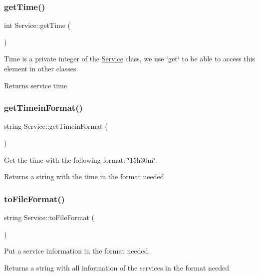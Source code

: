 \subsubsection{\texorpdfstring{get\+Time()}{getTime()}}
{\footnotesize\ttfamily int Service\+::get\+Time (\begin{DoxyParamCaption}{ }\end{DoxyParamCaption})}

Time is a private integer of the \hyperlink{classService}{Service} class, we use \char`\"{}get\char`\"{} to be able to access this element in other classes. \begin{DoxyReturn}{Returns}
service time 
\end{DoxyReturn}
\hypertarget{classService_aa0a732dc04ba4ec18709575f1dcdfee5}{}\label{classService_aa0a732dc04ba4ec18709575f1dcdfee5} 
\subsubsection{\texorpdfstring{get\+Timein\+Format()}{getTimeinFormat()}}
{\footnotesize\ttfamily string Service\+::get\+Timein\+Format (\begin{DoxyParamCaption}{ }\end{DoxyParamCaption})}

Get the time with the following format\+: \char`\"{}15h30m\char`\"{}. \begin{DoxyReturn}{Returns}
a string with the time in the format needed 
\end{DoxyReturn}
\hypertarget{classService_a4b8752741b37817a03bfc1e756174550}{}\label{classService_a4b8752741b37817a03bfc1e756174550} 
\subsubsection{\texorpdfstring{to\+File\+Format()}{toFileFormat()}}
{\footnotesize\ttfamily string Service\+::to\+File\+Format (\begin{DoxyParamCaption}{ }\end{DoxyParamCaption})}

Put a service information in the format needed. \begin{DoxyReturn}{Returns}
a string with all information of the services in the format needed 
\end{DoxyReturn}


